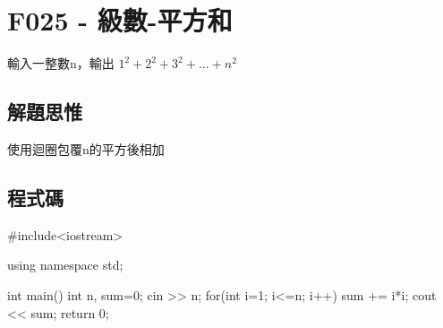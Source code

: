 \section{F025 - 級數-平方和}
輸入一整數n，輸出 $1^{2}+2^2+3^2+...+n^2$
\subsection{解題思惟}
使用迴圈包覆n的平方後相加
\subsection{程式碼}
\begin{cppcode}
#include<iostream>

using namespace std;

int main()
{
	int n, sum=0;
	cin >> n;
	for(int i=1; i<=n; i++) {
		sum += i*i;
	}
	cout << sum;
	return 0;
}
\end{cppcode}
